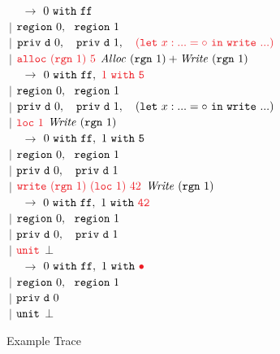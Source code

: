\begin{figure}
\begin{tabbing}
~~ $\longrightarrow$
   \>      \> $\sbvalue{0}{\tt{ff}}$                                                               
\\ \> $~|$ \> $\sregion{0},
                ~~ \sregion{1}$                                                                 
\\ \> $~|$ \> $\fprivd{0},
                ~~~ \fprivd{1},
                ~~~ \cdiff{(\flet{x}{...}{\tt{write}~ ...})}$
\\ \> $~|$ \> $\cdiff{\tt{alloc}~ (\trgn{1})~ 5}$
                                        \> $\tcAlloc~ (\trgn{1}) + \tcWrite~ (\trgn{1})$
\\[1.5ex]


~~ $\longrightarrow$
   \>      \> $\sbvalue{0}{\tt{ff}},
                ~ \cdiff{\sbvalue{1}{\tt{5}}}$                                                  
\\ \> $~|$ \> $\sregion{0},
                ~~ \sregion{1}$                                                                 
\\ \> $~|$ \> $\fprivd{0},
                ~~~ \fprivd{1},
                ~~~ (\flet{x}{...}{\tt{write}~ ...})$                                      
\\ \> $~|$ \> $\cdiff{\xloc{1}}$ 
                                        \> $\tcWrite~ (\trgn{1})$
\\[1.5ex]


~~ $\longrightarrow$
   \>      \> $\sbvalue{0}{\tt{ff}},~ \sbvalue{1}{\tt{5}}$                                         
\\ \> $~|$ \> $\sregion{0},
                ~~ \sregion{1}$                                                                 
\\ \> $~|$ \> $\fprivd{0},
                ~~~ \fprivd{1}$
\\ \> $~|$ \> $\cdiff{\tt{write}~ (\trgn{1})~ (\xloc{1})~ 42}$ 
                                        \> $\tcWrite~ (\trgn{1})$
\\[1.5ex]


~~ $\longrightarrow$
   \>      \> $\sbvalue{0}{\tt{ff}},~ \sbvalue{1}{\cdiff{\tt{42}}}$
\\ \> $~|$ \> $\sregion{0},
                ~~ \sregion{1}$                                                                 
\\ \> $~|$ \> $\fprivd{0},
                ~~~ \fprivd{1}$
\\ \> $~|$ \> $\cdiff{\tt{unit}}$          \> $\bot$
\\[1.5ex]


~~ $\longrightarrow$
\>      \> $\sbvalue{0}{\tt{ff}},~ \sbvalue{1}{\cdiff{\bullet}}$ \\ 
\> $~|$ \> $\sregion{0},
                ~~ \sregion{1}$ \\
\> $~|$ \> $\fprivd{0}$ \\
\> $~|$ \> $\tt{unit}$                  \> $\bot$ 
\end{tabbing}

\caption{Example Trace}
\label{f:ExampleTrace}

\vspace{2em}
\end{figure}
